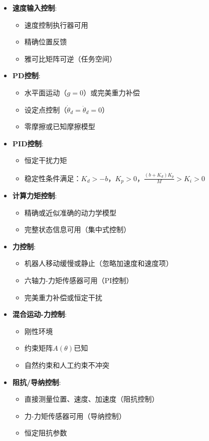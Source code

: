 \documentclass[12pt,a4paper]{article}
\begin{document}
\begin{itemize}
\item \textbf{速度输入控制}: 
  \begin{itemize}
  \item 速度控制执行器可用
  \item 精确位置反馈
  \item 雅可比矩阵可逆（任务空间）
  \end{itemize}

\item \textbf{PD控制}: 
  \begin{itemize}
  \item 水平面运动（$g = 0$）或完美重力补偿
  \item 设定点控制（$\dot{\theta}_d = \ddot{\theta}_d = 0$）
  \item 零摩擦或已知摩擦模型
  \end{itemize}

\item \textbf{PID控制}: 
  \begin{itemize}
  \item 恒定干扰力矩
  \item 稳定性条件满足：$K_d > -b$，$K_p > 0$，$\frac{(b + K_d)K_p}{M} > K_i > 0$
  \end{itemize}

\item \textbf{计算力矩控制}: 
  \begin{itemize}
  \item 精确或近似准确的动力学模型
  \item 完整状态信息可用（集中式控制）
  \end{itemize}

\item \textbf{力控制}: 
  \begin{itemize}
  \item 机器人移动缓慢或静止（忽略加速度和速度项）
  \item 六轴力-力矩传感器可用（PI控制）
  \item 完美重力补偿或恒定干扰
  \end{itemize}

\item \textbf{混合运动-力控制}: 
  \begin{itemize}
  \item 刚性环境
  \item 约束矩阵$A(\theta)$已知
  \item 自然约束和人工约束不冲突
  \end{itemize}

\item \textbf{阻抗/导纳控制}: 
  \begin{itemize}
  \item 直接测量位置、速度、加速度（阻抗控制）
  \item 力-力矩传感器可用（导纳控制）
  \item 恒定阻抗参数
  \end{itemize}
\end{itemize}
\end{document}
